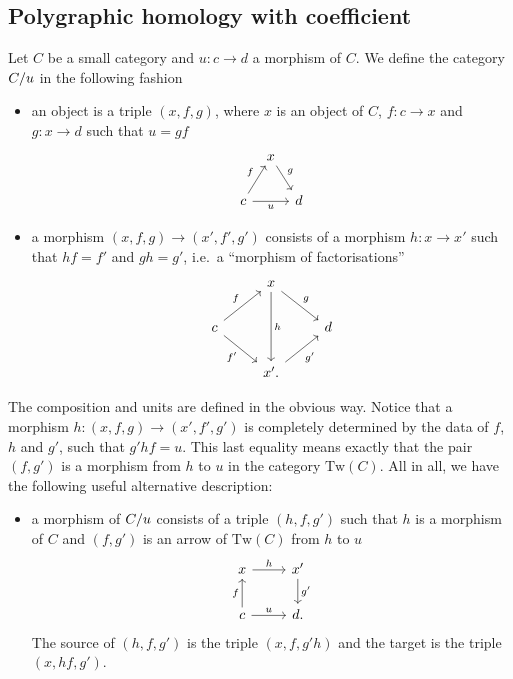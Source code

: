 \documentclass{amsart}
\newcommand{\Tw}[1]{\mathrm{Tw}(#1)}
\newcommand{\id}{\mathrm{id}}
\renewcommand{\tge}[1]{\target{} #1}
\renewcommand{\homset}[3]{\mathrm{Hom}_{#1}(#2,#3)}
\begin{document}
\subsection{Polygraphic homology with coefficient}
\begin{paragr}
  Let $C$ be a small category and $u \colon c \to d$ a morphism of
  $C$. We define the category $C/u$ in the following fashion
  \begin{itemize}
  \item an object is a triple $(x,f,g)$, where $x$ is an object of
    $C$, $f \colon c \to x$ and $g \colon x \to d$ such that $u=gf$
    \[
      \begin{tikzcd}[column sep=tiny]
        &x\ar[dr,"g"]&\\
        c \ar[ur,"f"]\ar[rr,"u"'] & &d
      \end{tikzcd}
    \]
  \item a morphism $(x,f,g) \to (x',f',g')$ consists of a morphism $h
    \colon x \to x'$ such that $h f = f'$ and $g h=g'$,
    i.e.\ a ``morphism of factorisations''
    \[
      \begin{tikzcd}
        & x \ar[dr,"g"]\ar[dd,"h"]&\\
        c \ar[ur,"f"] \ar[dr,"f'"'] & & d \\
        & x'. \ar[ur,"g'"']& 
      \end{tikzcd}
    \]
    \end{itemize}
    The composition and units are defined in the obvious way. Notice that a morphism $h \colon (x,f,g) \to (x',f',g')$ is
    completely determined by the data of $f$, $h$ and $g'$, such that
    $g'hf = u$. This last equality means exactly that the pair
    $(f,g')$ is a morphism from $h$ to $u$ in the category
    $\Tw{C}$. All in all, we
    have the following useful alternative description:
    \begin{itemize}
    \item a morphism of $C/u$ consists of a triple $(h,f,g')$
      such that $h$ is a morphism of $C$ and $(f,g')$ is an arrow of
      $\Tw{C}$ from $h$ to $u$
      \[
        \begin{tikzcd}
          x \ar[r,"h"]& x' \ar[d,"g'"]\\
          c\ar[u,"f"] \ar[r,"u"] & d.
        \end{tikzcd}
      \]
      The source of $(h,f,g')$ is the triple $(x,f,g'h)$ and the target
      is the triple $(x,hf,g')$.
    \end{itemize}
    
  \end{paragr}
\end{document}
